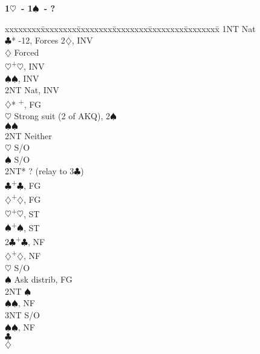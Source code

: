 \documentclass[10pt]{article}
\renewcommand{\c}{$\clubsuit$}
\renewcommand{\d}{$\diamondsuit$}
\newcommand{\h}{$\heartsuit$}
\newcommand{\s}{$\spadesuit$}
\newcommand{\p}{\textsuperscript{+}}
\newcommand{\m}{\textsuperscript{\textminus}}
\newenvironment{bidtable}[1][]
{\textbf{#1}
  \begin{adjustwidth}{1em}{}
    \addvspace{2pt}
    \begin{tabbing}
      xxxxxxxx\=xxxxxxxx\=xxxxxxxx\=xxxxxxxx\=xxxxxxxx\=xxxxxxxx\=\kill}
{\end{tabbing}\end{adjustwidth}\bigskip}%
\begin{document}
\begin{multicols*}{2}
\begin{bidtable}[1\h\ - 1\s\ - ?]
1NT \> Nat                                          \\
    \c* {}-12, Forces 2\d, INV               \\
    \>      \d \> Forced                        \\
    \>      \>     \h {}\p\h, INV             \\
    \>      \>     \s {}\s, INV               \\
    \>      \>     \> 2NT \> Nat, INV               \\
    \d* {}\p, FG                             \\
    \>      \h \> Strong suit (2 of AKQ), 2\m\s \\
    \>      \s {}\s                           \\
    \>      \> 2NT \> Neither                       \\
    \h  \> S/O                                  \\
    \s  \> S/O                                  \\
    \> 2NT* \> ? (relay to 3\c)                     \\
    \c  {}\p\c, FG                            \\
    \d  {}\p\d, FG                            \\
    \h  {}\p\h, ST                            \\
    \s  {}\p\s, ST                            \\
2\c {}\p\c, NF                                    \\
    \d  {}\p\d, NF                            \\
    \h  \> S/O                                  \\
    \s  \> Ask distrib, FG                      \\
    \>      \> 2NT \s                           \\
    \>      \>     \s {}\s, NF                \\
    \>      \>     \> 3NT \> S/O                    \\
    \>      \>     \s {}\s, NF                \\
    \>      \c {}                          \\
    \>      \d {}                          \\

\end{bidtable}
\end{multicols*}
\end{document}
